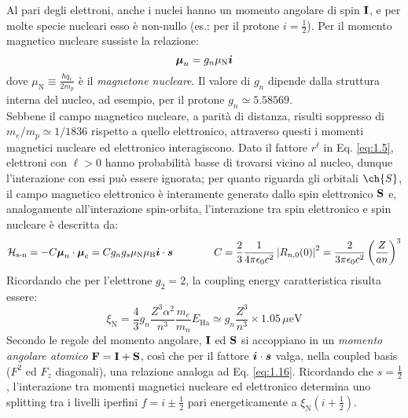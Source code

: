 Al pari degli elettroni, anche i nuclei hanno un momento angolare di spin $ \mathbf{I} $, e per molte specie nucleari esso è non-nullo (es.: per il protone $ i = \tfrac{1}{2} $). Per il momento magnetico nucleare sussiste la relazione:
\begin{equation}
	\boldsymbol{\mu}_n = g_n \mu_\text{N} \boldsymbol{i}
	\label{eq:1.22}
\end{equation}
dove $ \mu_\text{N} \equiv \frac{\hbar q_e}{2m_p} $ è il \textit{magnetone nucleare}. Il valore di $ g_n $ dipende dalla struttura interna del nucleo, ad esempio, per il protone $ g_n \simeq 5.58569 $.\\
Sebbene il campo magnetico nucleare, a parità di distanza, risulti soppresso di $ m_e / m_p \simeq 1 / 1836 $ rispetto a quello elettronico, attraverso questi i momenti magnetici nucleare ed elettronico interagiscono. Dato il fattore $ r^\ell $ in Eq. \ref{eq:1.5}, elettroni con $ \ell > 0 $ hanno probabilità basse di trovarsi vicino al nucleo, dunque l'interazione con essi può essere ignorata; per quanto riguarda gli orbitali $ \ch{S} $, il campo magnetico elettronico è interamente generato dallo spin elettronico $ \mathbf{S} $ e, analogamente all'interazione spin-orbita, l'interazione tra spin elettronico e spin nucleare è descritta da:
\begin{equation*}
	\mathcal{H}_\text{s-n} = - C \boldsymbol{\mu}_n \cdot \boldsymbol{\mu}_e = C g_n g_s \mu_\text{N} \mu_\text{B} \boldsymbol{i} \cdot \boldsymbol{s}
	\qquad \qquad
	C = \frac{2}{3} \frac{1}{4\pi \epsilon_0 c^2} \left\lvert R_{n,0}(0)\right\rvert^2 = \frac{2}{3\pi \epsilon_0 c^2} \left( \frac{Z}{an} \right)^3
\end{equation*}
Ricordando che per l'elettrone $ g_2 = 2 $, la coupling energy caratteristica risulta essere:
\begin{equation}
	\xi_\text{N} = \frac{4}{3} g_n \frac{Z^3 \alpha^2}{n^3} \frac{m_e}{m_n} E_\text{Ha} \simeq g_n \frac{Z^3}{n^3} \times 1.05\,\mu\text{eV}
	\label{eq:1.23}
\end{equation}
Secondo le regole del momento angolare, $ \mathbf{I} $ ed $ \mathbf{S} $ si accoppiano in un \textit{momento angolare atomico} $ \mathbf{F} = \mathbf{I} + \mathbf{S} $, così che per il fattore $ \boldsymbol{i} \cdot \boldsymbol{s} $ valga, nella coupled basis ($ F^2 $ ed $ F_z $ diagonali), una relazione analoga ad Eq. \ref{eq:1.16}. Ricordando che $ s = \tfrac{1}{2} $, l'interazione tra momenti magnetici nucleare ed elettronico determina uno splitting tra i livelli iperfini $ f = i \pm \tfrac{1}{2} $ pari energeticamente a $ \xi_\text{N} (i + \tfrac{1}{2}) $.

